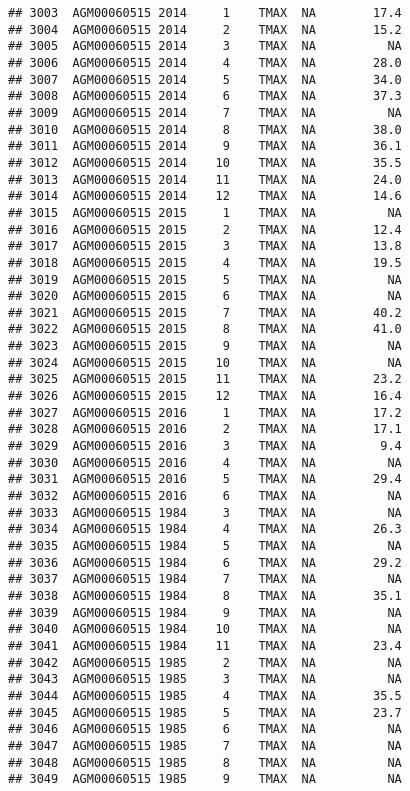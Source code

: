 \documentclass{article}\usepackage[]{graphicx}\usepackage[]{color}
\makeatletter
\newenvironment{kframe}{%
 \def\at@end@of@kframe{}%
 \ifinner\ifhmode%
  \def\at@end@of@kframe{\end{minipage}}%
  \begin{minipage}{\columnwidth}%
 \fi\fi%
 \def\FrameCommand##1{\hskip\@totalleftmargin \hskip-\fboxsep
 \colorbox{shadecolor}{##1}\hskip-\fboxsep
     \hskip-\linewidth \hskip-\@totalleftmargin \hskip\columnwidth}%
 \MakeFramed {\advance\hsize-\width
   \@totalleftmargin\z@ \linewidth\hsize
   \@setminipage}}%
 {\par\unskip\endMakeFramed%
 \at@end@of@kframe}
\newenvironment{knitrout}{}{} %
\makeatother
\begin{document}
\begin{knitrout}
\begin{kframe}
\begin{verbatim}
## 3003  AGM00060515 2014     1    TMAX  NA        17.4
## 3004  AGM00060515 2014     2    TMAX  NA        15.2
## 3005  AGM00060515 2014     3    TMAX  NA          NA
## 3006  AGM00060515 2014     4    TMAX  NA        28.0
## 3007  AGM00060515 2014     5    TMAX  NA        34.0
## 3008  AGM00060515 2014     6    TMAX  NA        37.3
## 3009  AGM00060515 2014     7    TMAX  NA          NA
## 3010  AGM00060515 2014     8    TMAX  NA        38.0
## 3011  AGM00060515 2014     9    TMAX  NA        36.1
## 3012  AGM00060515 2014    10    TMAX  NA        35.5
## 3013  AGM00060515 2014    11    TMAX  NA        24.0
## 3014  AGM00060515 2014    12    TMAX  NA        14.6
## 3015  AGM00060515 2015     1    TMAX  NA          NA
## 3016  AGM00060515 2015     2    TMAX  NA        12.4
## 3017  AGM00060515 2015     3    TMAX  NA        13.8
## 3018  AGM00060515 2015     4    TMAX  NA        19.5
## 3019  AGM00060515 2015     5    TMAX  NA          NA
## 3020  AGM00060515 2015     6    TMAX  NA          NA
## 3021  AGM00060515 2015     7    TMAX  NA        40.2
## 3022  AGM00060515 2015     8    TMAX  NA        41.0
## 3023  AGM00060515 2015     9    TMAX  NA          NA
## 3024  AGM00060515 2015    10    TMAX  NA          NA
## 3025  AGM00060515 2015    11    TMAX  NA        23.2
## 3026  AGM00060515 2015    12    TMAX  NA        16.4
## 3027  AGM00060515 2016     1    TMAX  NA        17.2
## 3028  AGM00060515 2016     2    TMAX  NA        17.1
## 3029  AGM00060515 2016     3    TMAX  NA         9.4
## 3030  AGM00060515 2016     4    TMAX  NA          NA
## 3031  AGM00060515 2016     5    TMAX  NA        29.4
## 3032  AGM00060515 2016     6    TMAX  NA          NA
## 3033  AGM00060515 1984     3    TMAX  NA          NA
## 3034  AGM00060515 1984     4    TMAX  NA        26.3
## 3035  AGM00060515 1984     5    TMAX  NA          NA
## 3036  AGM00060515 1984     6    TMAX  NA        29.2
## 3037  AGM00060515 1984     7    TMAX  NA          NA
## 3038  AGM00060515 1984     8    TMAX  NA        35.1
## 3039  AGM00060515 1984     9    TMAX  NA          NA
## 3040  AGM00060515 1984    10    TMAX  NA          NA
## 3041  AGM00060515 1984    11    TMAX  NA        23.4
## 3042  AGM00060515 1985     2    TMAX  NA          NA
## 3043  AGM00060515 1985     3    TMAX  NA          NA
## 3044  AGM00060515 1985     4    TMAX  NA        35.5
## 3045  AGM00060515 1985     5    TMAX  NA        23.7
## 3046  AGM00060515 1985     6    TMAX  NA          NA
## 3047  AGM00060515 1985     7    TMAX  NA          NA
## 3048  AGM00060515 1985     8    TMAX  NA          NA
## 3049  AGM00060515 1985     9    TMAX  NA          NA

\end{verbatim}
\end{kframe}
\end{knitrout}
\end{document}
